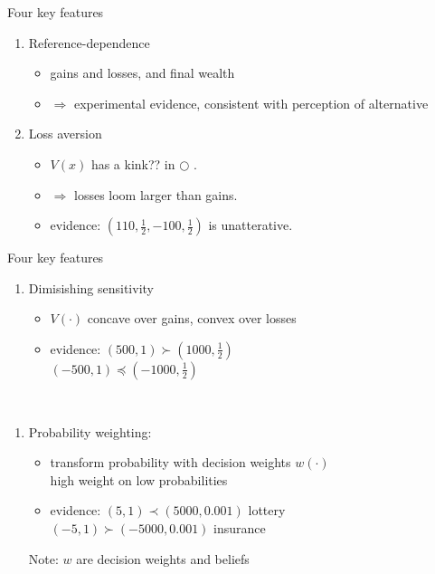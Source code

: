 \documentclass[11pt,aspectratio=169]{beamer}
\begin{document}
\begin{frame}{Four key features}
    \begin{enumerate}[1.]
        \item Reference-dependence
            \begin{itemize}
                \item gains and losses, and final wealth
                \item $\Rightarrow$ experimental evidence, consistent with perception of alternative \medskip
            \end{itemize}
        \item Loss aversion
            \begin{itemize}
                \item $V(x)$ has a kink?? in $\bigcirc$ .
                \item $\Rightarrow$ losses loom larger than gains.\\
                \item   evidence: $(110,\frac{1}{2},-100,\frac{1}{2})$ is unatterative.
            \end{itemize}
    \end{enumerate}
\end{frame}

\begin{frame}{Four key features}
    \begin{enumerate}[3.]
        \item Dimisishing sensitivity\\
            \begin{itemize}
                \item $V(\cdot)$ concave over gains, convex over losses
                \item evidence: $(500,1) \succ (1000,\frac{1}{2})$\\
                \qquad  $(-500,1) \preceq  (-1000,\frac{1}{2})$
            \end{itemize}
            \hspace*{\fill} \\
    \end{enumerate}
    \begin{enumerate}[4.]
        \item Probability weighting:\\
            \begin{itemize}
                \item transform probability with decision weights $w(\cdot )$\\
                high weight on low probabilities\\
                \item evidence: $(5,1)\prec (5000,0.001)$ lottery\\
                \qquad  $(-5,1)\succ (-5000,0.001)$ insurance
            \end{itemize}
            Note: $w$ are decision weights and beliefs
    \end{enumerate}
\end{frame}
\end{document}
